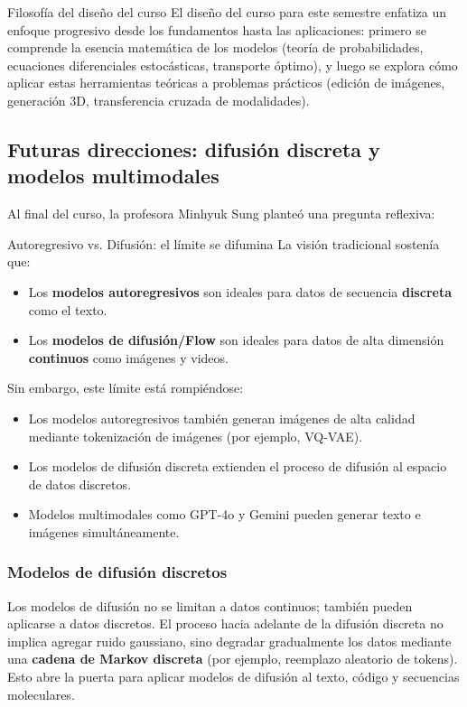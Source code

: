 \documentclass[a4paper]{article}
\begin{document}
\begin{importantbox}{Filosofía del diseño del curso}
El diseño del curso para este semestre enfatiza un enfoque progresivo desde los fundamentos hasta las aplicaciones: primero se comprende la esencia matemática de los modelos (teoría de probabilidades, ecuaciones diferenciales estocásticas, transporte óptimo), y luego se explora cómo aplicar estas herramientas teóricas a problemas prácticos (edición de imágenes, generación 3D, transferencia cruzada de modalidades).
\end{importantbox}

\subsection{Futuras direcciones: difusión discreta y modelos multimodales}

Al final del curso, la profesora Minhyuk Sung planteó una pregunta reflexiva:

\begin{importantbox}{Autoregresivo vs. Difusión: el límite se difumina}
La visión tradicional sostenía que:
\begin{itemize}
    \item Los \textbf{modelos autoregresivos} son ideales para datos de secuencia \textbf{discreta} como el texto.
    \item Los \textbf{modelos de difusión/Flow} son ideales para datos de alta dimensión \textbf{continuos} como imágenes y videos.
\end{itemize}

Sin embargo, este límite está rompiéndose:
\begin{itemize}
    \item Los modelos autoregresivos también generan imágenes de alta calidad mediante tokenización de imágenes (por ejemplo, VQ-VAE).
    \item Los modelos de difusión discreta extienden el proceso de difusión al espacio de datos discretos.
    \item Modelos multimodales como GPT-4o y Gemini pueden generar texto e imágenes simultáneamente.
\end{itemize}
\end{importantbox}

\subsubsection{Modelos de difusión discretos}

Los modelos de difusión no se limitan a datos continuos; también pueden aplicarse a datos discretos. El proceso hacia adelante de la difusión discreta no implica agregar ruido gaussiano, sino degradar gradualmente los datos mediante una \textbf{cadena de Markov discreta} (por ejemplo, reemplazo aleatorio de tokens). Esto abre la puerta para aplicar modelos de difusión al texto, código y secuencias moleculares.
\end{document}
